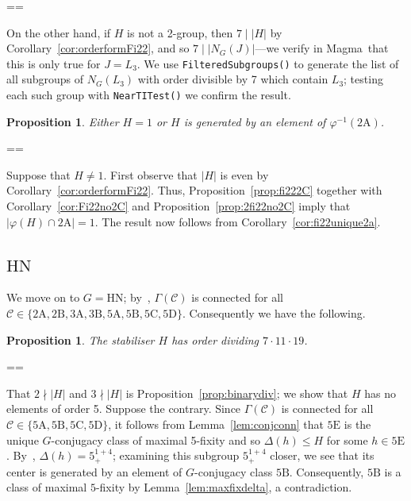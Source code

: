 \documentclass[11pt, a4paper]{amsart}
\makeatletter
\newcommand{\magma}{{\sc Magma}}
\newtheorem{prop}[thm]{Proposition}
\renewcommand{\proofname}{Proof}
\renewenvironment{proof}[1][\proofname]{\par
  \pushQED{\qed}  \normalfont \partopsep=\z@skip \topsep=\z@skip
  \trivlist
  \item[\hskip\labelsep
        \scshape
    #1\@addpunct{.}]\ignorespaces
}{  \popQED\endtrivlist\@endpefalse
}
\makeatother
\begin{document}
\begin{proof}
    On the other hand, if $H$ is not a 2-group, then $7\mid |H|$ by Corollary~\ref{cor:orderformFi22}, and so $7\mid |N_G(J)|$---we verify in \magma~that this is only true for $J=L_3$. We use {\tt FilteredSubgroups()} to generate the list of all subgroups of $N_G(L_3)$ with order divisible by 7 which contain $L_3$; testing each such group with {\tt NearTITest()} we confirm the result.
             \end{proof}
\begin{prop}\label{prop:clasFi22}
    Either $H=1$ or $H$ is generated by an element of $\varphi^{-1}(\mathrm{2A})$.
\end{prop}
\begin{proof}
    Suppose that $H\ne 1$. First observe that $|H|$ is even by Corollary~\ref{cor:orderformFi22}. Thus, Proposition~\ref{prop:fi222C} together with Corollary~\ref{cor:Fi22no2C} and Proposition~\ref{prop:2fi22no2C} imply that $|\varphi(H)\cap\mathrm{2A}|=1$. The result now follows from Corollary~\ref{cor:fi22unique2a}. 
   \end{proof}

\subsection{$\mathrm{HN}$} We move on to $G=\mathrm{HN}$; by~\cite[Propositions 3.1, 3.2, and 3.3]{CDP}, $\Gamma(\mathcal{C})$ is connected for all $\mathcal{C}\in\{\mathrm{2A,2B,3A,3B,5A,5B,5C,5D}\}$. Consequently we have the following.

\begin{prop}\label{prop:firstredHN}
    The stabiliser $H$ has order dividing $7\cdot 11\cdot 19$.
\end{prop}
\begin{proof}
    That $2\nmid|H|$ and $3\nmid |H|$ is Proposition~\ref{prop:binarydiv}; we show that $H$ has no elements of order 5. Suppose the contrary. Since $\Gamma(\mathcal{C})$ is connected for all $\mathcal{C}\in\{\mathrm{5A,5B,5C,5D}\}$, it follows from Lemma~\ref{lem:conjconn} that $\mathrm{5E}$ is the unique $G$-conjugacy class of maximal 5-fixity and so $\Delta(h)\leq H$ for some $h\in\mathrm{5E}$. By~\cite[Proposition 3.3]{CDP}, $\Delta(h)=5^{1+4}_+$; examining this subgroup $5^{1+4}_+$ closer, we see that its center is generated by an element of $G$-conjugacy class $\mathrm{5B}$. Consequently, $\mathrm{5B}$ is a class of maximal $5$-fixity by Lemma~\ref{lem:maxfixdelta}, a contradiction.
\end{proof}
\end{document}
